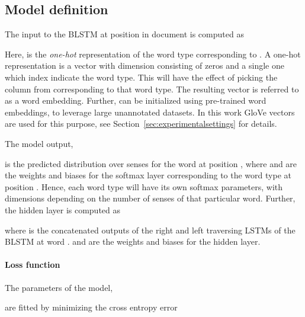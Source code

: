 \documentclass[11pt]{article}
\newcommand{\Sec}[1]{Section~\ref{#1}}
\begin{document}
\subsection{Model definition}
The input to the BLSTM at position  in document  is computed as

Here,  is the \emph{one-hot} representation of the word type corresponding to . A one-hot representation is a vector with dimension  consisting of  zeros and a single one which index indicate the word type. This will have the effect of picking the column from  corresponding to that word type. The resulting vector is referred to as a word embedding. Further,  can be initialized using pre-trained word embeddings, to leverage large unannotated datasets. In this work GloVe vectors are used for this purpose, see \Sec{sec:experimentalsettings} for details.

The model output, 

is the predicted distribution over senses for the word at position , where  and  are the weights and biases for the softmax layer corresponding to the word type at position . Hence, each word type will have its own softmax parameters, with dimensions depending on the number of senses of that particular word. 
Further, the hidden layer  is computed as 
 
where  is the concatenated outputs of the right and left traversing LSTMs of the BLSTM at word .  and  are the weights and biases for the hidden layer.




\paragraph{Loss function}
The parameters of the model,


are fitted by minimizing the cross entropy error 
\end{document}
